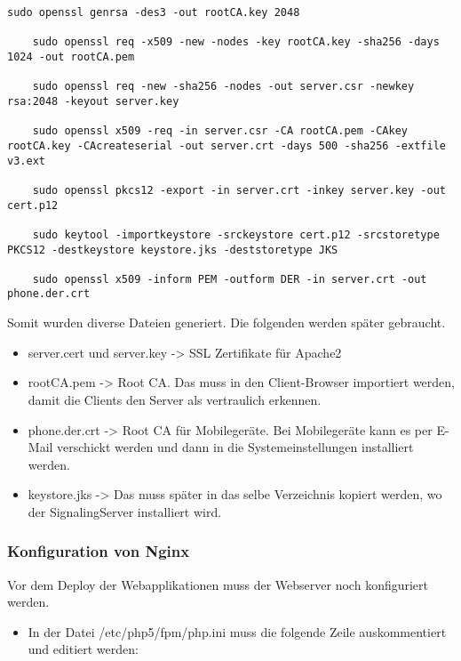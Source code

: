 \begin{lstlisting}[backgroundcolor = \color{snippetcolor},
xleftmargin = 0.5cm,
framexleftmargin = 0.1em,
breaklines=true]
	sudo openssl genrsa -des3 -out rootCA.key 2048
	
	sudo openssl req -x509 -new -nodes -key rootCA.key -sha256 -days 1024 -out rootCA.pem
	
	sudo openssl req -new -sha256 -nodes -out server.csr -newkey rsa:2048 -keyout server.key
	
	sudo openssl x509 -req -in server.csr -CA rootCA.pem -CAkey rootCA.key -CAcreateserial -out server.crt -days 500 -sha256 -extfile v3.ext
	
	sudo openssl pkcs12 -export -in server.crt -inkey server.key -out cert.p12
	
	sudo keytool -importkeystore -srckeystore cert.p12 -srcstoretype PKCS12 -destkeystore keystore.jks -deststoretype JKS
	
	sudo openssl x509 -inform PEM -outform DER -in server.crt -out phone.der.crt

\end{lstlisting}

Somit wurden diverse Dateien generiert. Die folgenden werden später gebraucht.
\begin{itemize}
	\item server.cert und server.key -> SSL Zertifikate für Apache2
	\item rootCA.pem -> Root CA. Das muss in den Client-Browser importiert werden, damit die Clients den Server als vertraulich erkennen. 
	\item phone.der.crt -> Root CA für Mobilegeräte. Bei Mobilegeräte kann es per E-Mail verschickt werden und dann in die  Systemeinstellungen installiert werden.
	\item keystore.jks -> Das muss später in das selbe Verzeichnis kopiert werden, wo der SignalingServer installiert wird.  
\end{itemize}

\subsubsection{Konfiguration von Nginx}
Vor dem Deploy der Webapplikationen muss der Webserver noch konfiguriert werden.
\\
\begin{itemize}
	\item In der Datei /etc/php5/fpm/php.ini muss die folgende Zeile auskommentiert und editiert werden: 
\end{itemize}

